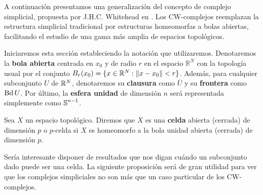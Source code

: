 A continuación presentamos una generalización del concepto de complejo simplicial,
propuesta por J.H.C. Whitehead en \cite{MR0030759}. Los CW-complejos reemplazan
la estructura simplicial tradicional por estructuras homeomorfas a bolas
abiertas, facilitando el estudio de una gama más amplia de espacios topológicos.

Iniciaremos esta sección estableciendo la notación que utilizaremos. Denotaremos
la \textbf{bola abierta} centrada en $x_{0}$ y de radio $r$ en el espacio $\mathbb{R}
^{N}$ con la topología usual por el conjunto $B_{r}(x_{0}) = \{ x \in \mathbb{R}^{N}: \|
x - x_{0}\| < r \}$. Además, para cualquier subconjunto $U$ de $\mathbb{R}^{N}$,
denotaremos su \textbf{clausura} como $\overline{U}$ y su \textbf{frontera} como
$\operatorname{Bd} U$. Por último, la \textbf{esfera unidad} de dimensión $n$ será representada
simplemente como $\operatorname{\mathbb{S}}^{n-1}$.

\begin{definicion}
	Sea $X$ un espacio topológico. Diremos que $X$ es una \textbf{celda} abierta (cerrada)
	de dimensión $p$ o $p$-celda si $X$ es homeomorfo a la bola unidad abierta (cerrada)
	de dimensión $p$.
\end{definicion}

Sería interesante disponer de resultados que nos digan cuándo un subconjunto
dado puede ser una celda. La siguiente proposición será de gran utilidad para ver
que los complejos simpliciales no son más que un caso particular de los CW-complejos.

